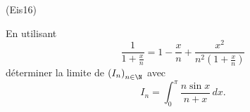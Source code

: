 \begin{tiny}(Eis16)\end{tiny} En utilisant
\begin{displaymath}
 \frac{1}{1+\frac{x}{n}}=1-\frac{x}{n}+\frac{x^2}{n^2(1+\frac{x}{n})}
\end{displaymath}
déterminer la limite de $\left(I_n\right) _{n\in \N}$ avec
\begin{displaymath}
 I_n = \int_{0}^\pi\frac{n\sin x}{n+x}\,dx.
\end{displaymath} 